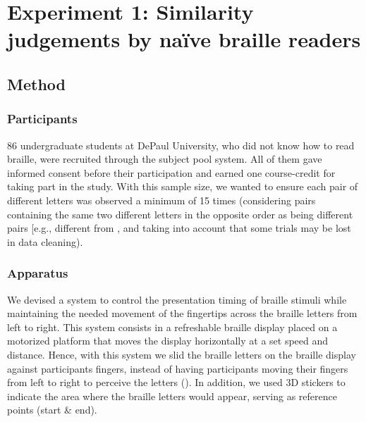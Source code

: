 \documentclass[
  english,
  man]{apa7}
\begin{document}
\hypertarget{experiment-1-similarity-judgements-by-nauxefve-braille-readers}{%
\section{Experiment 1: Similarity judgements by naïve braille readers}\label{experiment-1-similarity-judgements-by-nauxefve-braille-readers}}

\hypertarget{method}{%
\subsection{Method}\label{method}}

\hypertarget{participants}{%
\subsubsection{Participants}\label{participants}}

86 undergraduate students at DePaul University, who did not know how to read braille, were recruited through the subject pool system. All of them gave informed consent before their participation and earned one course-credit for taking part in the study. With this sample size, we wanted to ensure each pair of different letters was observed a minimum of 15 times (considering pairs containing the same two different letters in the opposite order as being different pairs {[}e.g.,   different from  \braille{l}{]}, and taking into account that some trials may be lost in data cleaning).

\hypertarget{apparatus}{%
\subsubsection{Apparatus}\label{apparatus}}

We devised a system to control the presentation timing of braille stimuli while maintaining the needed movement of the fingertips across the braille letters from left to right. This system consists in a refreshable braille display placed on a motorized platform that moves the display horizontally at a set speed and distance. Hence, with this system we slid the braille letters on the braille display against participants fingers, instead of having participants moving their fingers from left to right to perceive the letters ({\colorbox{blue}{\sffamily\scriptsize\bfseries\color{white}{abl}}}{\sffamily\small\itshape\color{blue}{see Appendix X for a a more detailed description and visualization of the apparatus}}). In addition, we used 3D stickers to indicate the area where the braille letters would appear, serving as reference points (start \& end).
\end{document}
